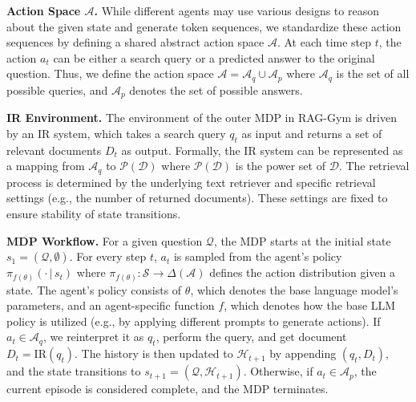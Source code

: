 \noindent \textbf{Action Space $\mathcal{A}$.} While different agents may use various designs to reason about the given state and generate token sequences, we standardize these action sequences by defining a shared abstract action space \(\mathcal{A}\). At each time step \(t\), the action \(a_t\) can be either a search query or a predicted answer to the original question. Thus, we define the action space \(\mathcal{A} = \mathcal{A}_q \cup \mathcal{A}_p\) where  \(\mathcal{A}_q\) is the set of all possible queries,  and \(\mathcal{A}_p\) denotes the set of possible answers.


\noindent \textbf{IR Environment.} The environment of the outer MDP in RAG-Gym is driven by an IR system, which takes a search query \(q_t\) as input and returns a set of relevant documents \({D}_t\) as output. Formally, the IR system can be represented as a mapping from \(\mathcal{A}_q\) to \(\mathcal{P}(\mathcal{D})\)
where \(\mathcal{P}(\mathcal{D})\) is the power set of \(\mathcal{D}\). The retrieval process is determined by the underlying text retriever and specific retrieval settings (e.g., the number of returned documents). These settings are fixed to ensure stability of state transitions.


\noindent \textbf{MDP Workflow.} For a given question $\mathcal{Q}$, the MDP starts at the initial state $s_1 = (\mathcal{Q}, \emptyset)$. For every step $t$, $a_t$ is  sampled from the agent's policy $\pi_{f(\theta)}(\cdot\,|\, s_t)$ where $\pi_{f(\theta)}: \mathcal{S} \rightarrow \Delta(\mathcal{A})$ defines the action distribution given a state. The agent's policy consists of $\theta$, which denotes the base language model's parameters, and an agent-specific function $f$, which denotes how the base LLM policy is utilized (e.g., by applying different prompts to generate actions).  If $a_t \in \mathcal{A}_q$, we reinterpret it as $q_t$,  perform the query, and get document \({D}_t = \text{IR}(q_t)\). The history is then updated to $\mathcal{H}_{t+1}$ by appending $(q_t, {D}_t)$, and the state transitions to $s_{t+1} = (\mathcal{Q}, \mathcal{H}_{t+1})$. Otherwise, if $a_t \in \mathcal{A}_p$, the current episode is considered complete, and the MDP terminates.

